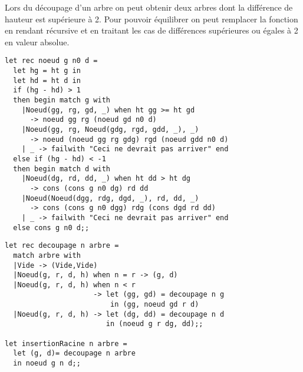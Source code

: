 \begin{Answer} 
Lors du découpage d'un arbre on peut obtenir deux arbres dont la différence de hauteur est supérieure à 2. Pour pouvoir équilibrer on peut remplacer la fonction  en rendant récursive et en traitant les cas de différences supérieures ou égales à 2 en valeur absolue.

\begin{lstlisting}
let rec noeud g n0 d =
  let hg = ht g in
  let hd = ht d in
  if (hg - hd) > 1
  then begin match g with
    |Noeud(gg, rg, gd, _) when ht gg >= ht gd 
      -> noeud gg rg (noeud gd n0 d)
    |Noeud(gg, rg, Noeud(gdg, rgd, gdd, _), _)
      -> noeud (noeud gg rg gdg) rgd (noeud gdd n0 d)
    | _ -> failwith "Ceci ne devrait pas arriver" end
  else if (hg - hd) < -1 
  then begin match d with
    |Noeud(dg, rd, dd, _) when ht dd > ht dg
      -> cons (cons g n0 dg) rd dd
    |Noeud(Noeud(dgg, rdg, dgd, _), rd, dd, _) 
      -> cons (cons g n0 dgg) rdg (cons dgd rd dd)
    | _ -> failwith "Ceci ne devrait pas arriver" end
  else cons g n0 d;;
\end{lstlisting}

\begin{lstlisting}
let rec decoupage n arbre = 
  match arbre with
  |Vide -> (Vide,Vide)
  |Noeud(g, r, d, h) when n = r -> (g, d)
  |Noeud(g, r, d, h) when n < r
                     -> let (gg, gd) = decoupage n g 
                         in (gg, noeud gd r d)
  |Noeud(g, r, d, h) -> let (dg, dd) = decoupage n d 
                        in (noeud g r dg, dd);;

let insertionRacine n arbre =
  let (g, d)= decoupage n arbre
  in noeud g n d;;
\end{lstlisting}
\end{Answer}


